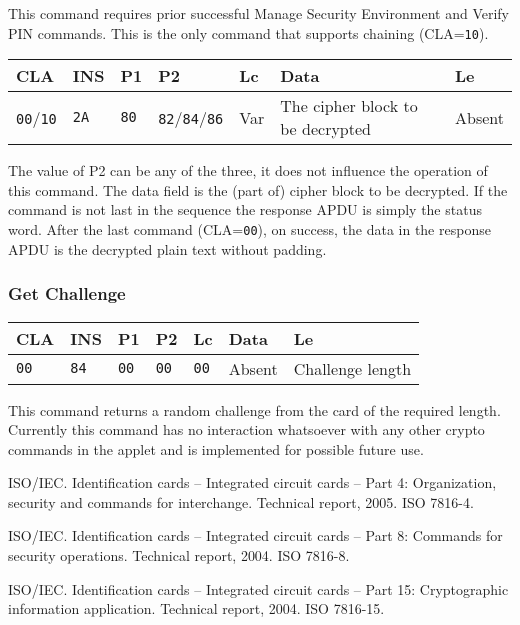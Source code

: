 \documentclass{article}
\begin{document}
This command requires prior successful Manage Security Environment and
Verify PIN commands.  This is the only command that supports chaining
(CLA=\texttt{10}).
\begin{flushleft}
\begin{tabular}{|l|l|l|l|l|l|l|}
\hline
CLA & INS & P1 & P2 & Lc & Data & Le \\
\hline
\texttt{00}/\texttt{10} & \texttt{2A} & \texttt{80} & \texttt{82}/\texttt{84}/\texttt{86} &
Var & The cipher block to be decrypted & Absent \\
\hline
\end{tabular}
\end{flushleft}
The value of P2 can be any of the three, it does not influence the
operation of this command.  The data field is the (part of) cipher
block to be decrypted.  If the command is not last in the sequence the
response APDU is simply the status word.  After the last command
(CLA=\texttt{00}), on success, the data in the response APDU is the
decrypted plain text without padding.

\subsubsection{Get Challenge}

\begin{flushleft}
\begin{tabular}{|l|l|l|l|l|l|l|}
\hline
CLA & INS & P1 & P2 & Lc & Data & Le \\
\hline
\texttt{00} & \texttt{84} & \texttt{00} & \texttt{00} &
\texttt{00} & Absent & Challenge length \\
\hline
\end{tabular}
\end{flushleft}
This command returns a random challenge from the card of the required
length. Currently this command has no interaction whatsoever with any
other crypto commands in the applet and is implemented for possible
future use.

\begin{thebibliography}{1}
 ISO/IEC.  \newblock Identification cards -- Integrated circuit cards --
  Part 4: Organization, security and commands for interchange.  \newblock Technical report,
  2005.  \newblock ISO 7816-4.

 ISO/IEC.  \newblock Identification cards -- Integrated circuit cards --
  Part 8: Commands for security operations.  \newblock Technical report,
  2004.  \newblock ISO 7816-8.

 ISO/IEC.  \newblock Identification cards -- Integrated circuit cards --
  Part 15: Cryptographic information application. \newblock Technical report,
  2004.  \newblock ISO 7816-15.


\end{thebibliography}
\end{document}
